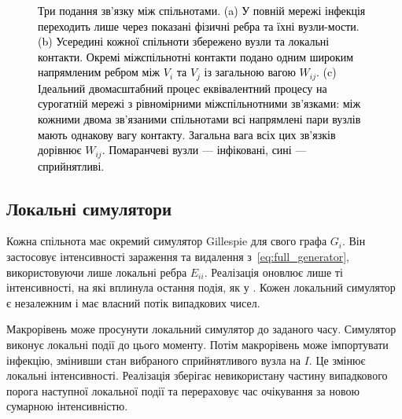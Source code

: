 \documentclass[a4paper,fleqn]{cas-sc}
\begin{document}
\begin{figure}[tbp]
\caption{\textcolor{black}{Три подання зв'язку між спільнотами. (a) У повній мережі інфекція переходить лише через показані фізичні ребра та їхні вузли-мости. (b) Усередині кожної спільноти збережено вузли та локальні контакти. Окремі міжспільнотні контакти подано одним широким напрямленим ребром між $V_i$ та $V_j$ із загальною вагою $W_{ij}$. (c) Ідеальний двомасштабний процес еквівалентний процесу на сурогатній мережі з рівномірними міжспільнотними зв’язками: між кожними двома зв’язаними спільнотами всі напрямлені пари вузлів мають однакову вагу контакту. Загальна вага всіх цих зв'язків дорівнює $W_{ij}$. Помаранчеві вузли --- інфіковані, сині --- сприйнятливі.}}
\label{fig:schematic}
\end{figure}

\subsection{Локальні симулятори}
\label{sec:local}

Кожна спільнота має окремий симулятор Gillespie для свого графа $G_i$. Він застосовує інтенсивності зараження та видалення з~\eqref{eq:full_generator}, використовуючи лише локальні ребра $E_{ii}$. Реалізація оновлює лише ті інтенсивності, на які вплинула остання подія, як у \citet{kuryliak2025simulating}. Кожен локальний симулятор є незалежним і має власний потік випадкових чисел.

Макрорівень може просунути локальний симулятор до заданого часу. Симулятор виконує локальні події до цього моменту. Потім макрорівень може імпортувати інфекцію, змінивши стан вибраного сприйнятливого вузла на $I$. Це змінює локальні інтенсивності. Реалізація зберігає невикористану частину випадкового порога наступної локальної події та перераховує час очікування за новою сумарною інтенсивністю. 
\end{document}
